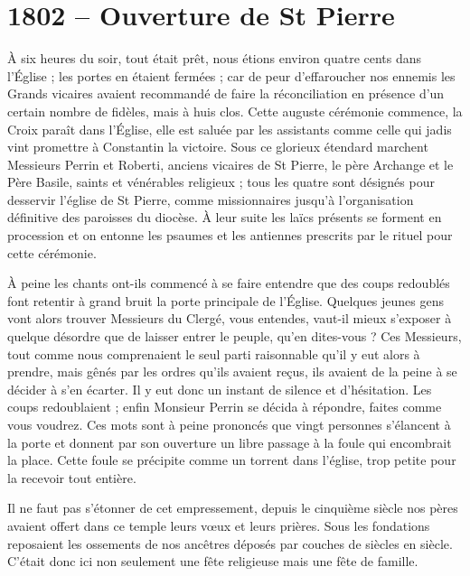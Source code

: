 \documentclass[11pt,a4paper]{report}
\begin{document}
\section*{1802 -- Ouverture de St Pierre}

À six heures du soir, tout était prêt, nous étions environ quatre cents dans l'Église ; les portes en étaient fermées ; car de peur d'effaroucher nos ennemis les Grands vicaires avaient recommandé de faire la réconciliation en présence d'un certain nombre de fidèles, mais à huis clos. Cette auguste cérémonie commence, la Croix paraît dans l'Église, elle est saluée par les assistants comme celle qui jadis vint promettre à Constantin la victoire. Sous ce glorieux étendard marchent Messieurs Perrin et Roberti, anciens vicaires de St Pierre, le père Archange et le Père Basile, saints et vénérables religieux ; tous les quatre sont désignés pour desservir l'église de St Pierre, comme missionnaires jusqu'à l'organisation définitive des paroisses du diocèse. À leur suite les laïcs présents se forment en procession et on entonne les psaumes et les antiennes prescrits par le rituel pour cette cérémonie.

À peine les chants ont-ils commencé à se faire entendre que des coups redoublés font retentir à grand bruit la porte principale de l'Église. Quelques jeunes gens vont alors trouver Messieurs du Clergé, vous entendes, vaut-il mieux s'exposer à quelque désordre que de laisser entrer le peuple, qu'en dites-vous ? Ces Messieurs, tout comme nous comprenaient le seul parti raisonnable qu'il y eut alors à prendre, mais gênés par les ordres qu'ils avaient reçus, ils avaient de la peine à se décider à s'en écarter. Il y eut donc un instant de silence et d'hésitation. Les coups redoublaient ; enfin Monsieur Perrin se décida à répondre, faites comme vous voudrez. Ces mots sont à peine prononcés que vingt personnes s'élancent à la porte et donnent par son ouverture un libre passage à la foule qui encombrait la place. Cette foule se précipite comme un torrent dans l'église, trop petite pour la recevoir tout entière.

Il ne faut pas s'étonner de cet empressement, depuis le cinquième siècle nos pères avaient offert dans ce temple leurs vœux et leurs prières. Sous les fondations reposaient les ossements de nos ancêtres déposés par couches de siècles en siècle. C'était donc ici non seulement une fête religieuse mais une fête de famille.
\end{document}
